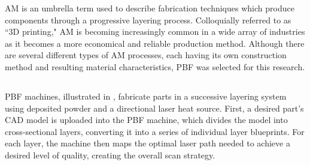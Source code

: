 \gls{AM} is an umbrella term used to describe fabrication techniques which produce components through a progressive layering process. Colloquially referred to as ``3D printing," \gls{AM} is becoming increasingly common in a wide array of industries as it becomes a more economical and reliable production method. Although there are several different types of \gls{AM} processes, each having its own construction method and resulting material characteristics, \gls{PBF} was selected for this research.


\subsection{} \label{sec:2_PBF}


\gls{PBF} machines, illustrated in , fabricate parts in a successive layering system using deposited powder and a directional laser heat source. First, a desired part's \gls{CAD} model is uploaded into the \gls{PBF} machine, which divides the model into cross-sectional layers, converting it into a series of individual layer blueprints. For each layer, the machine then maps the optimal laser path needed to achieve a desired level of quality, creating the overall scan strategy.


